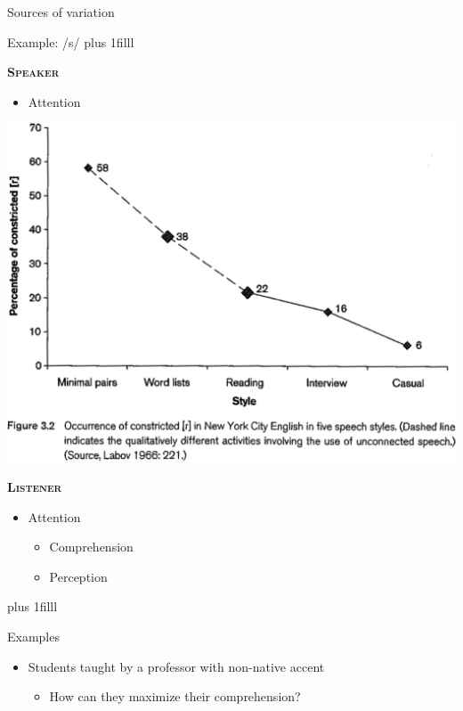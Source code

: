\documentclass{beamer}
\newcommand{\btVFill}{\vskip0pt plus 1filll}
\begin{document}
\begin{frame}{Sources of variation}

Example: /s/
\btVFill
\begin{minipage}[t]{0.45\textwidth}
\textbf{\textsc{Speaker}}

\begin{itemize}
\item Attention
\end{itemize}
\includegraphics[width=1.3\textwidth]{pictures/Labov1997-mod}
\end{minipage}
\hfill
\begin{minipage}[t]{0.45\textwidth}
\textbf{\textsc{Listener}}

\begin{itemize}
\item Attention
\begin{itemize}
\item Comprehension
\item Perception
\end{itemize}
\end{itemize}
\end{minipage}
\btVFill
\begin{flushright}
\scriptsize
\citet{Labov1997, Pitt2012}
\end{flushright}
\end{frame}

\begin{frame}{Examples}

\begin{itemize}
\item Students taught by a professor with non-native accent
\begin{itemize}
\item How can they maximize their comprehension?
\end{itemize}
\end{itemize}

\end{frame}
\end{document}

